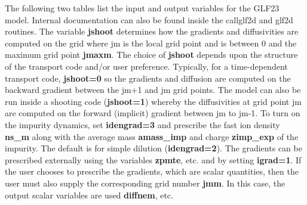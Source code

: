 The following two tables list the input and output variables for the GLF23 model.
Internal documentation can also be found inside the callglf2d and glf2d routines.
The variable {\bf jshoot} determines how the gradients and diffusivities are
computed on the grid where jm is the local grid point and is between 0 and the
maximum grid point {\bf jmaxm}.
The choice of {\bf jshoot} depends upon the structure of the transport
code and/or user preference. Typically, for a time-dependent transport code, 
{\bf jshoot=0} so the gradients and diffusion are computed on the backward gradient 
between the jm+1 and jm grid points. The model 
can also be run inside a shooting code ({\bf jshoot=1}) whereby the diffusivities 
at grid point jm are computed on the forward (implicit) gradient between jm to jm-1. 
To turn on the impurity dynamics, set {\bf idengrad=3} and prescribe the fast ion
density {\bf ns\_m} along with the average mass {\bf amass\_imp} and charge 
{\bf zimp\_exp} of the impurity. The default is for simple dilution ({\bf idengrad=2}).
The gradients can be prescribed externally using the variables {\bf zpmte}, etc. and 
by setting {\bf igrad=1}. If the user chooses to prescribe the gradients, which
are scalar quantities, then the user must also supply the corresponding grid
number {\bf jmm}. In this case, the output scalar variables are used 
{\bf diffnem}, etc.

\vspace{5mm}

